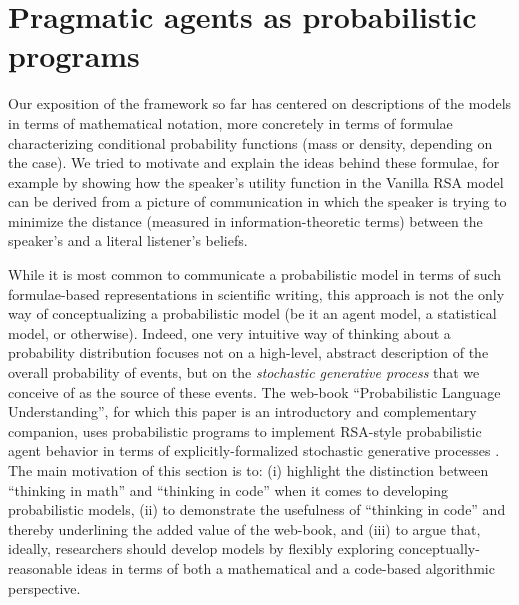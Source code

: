 \documentclass[10pt,letterpaper]{article}
\newcommand{\gcs}[1]{\textcolor{blue}{[gcs: #1]}}
\newcommand{\mht}[1]{\textcolor{purple}{[mht: #1]}}
\begin{document}
%

\section*{Pragmatic agents as probabilistic programs} \label{prob-programs}

Our exposition of the framework so far has centered on descriptions of the models in terms of mathematical notation, more concretely in terms of formulae characterizing conditional probability functions (mass or density, depending on the case).
We tried to motivate and explain the ideas behind these formulae, for example by showing how the speaker's utility function in the Vanilla RSA model can be derived from a picture of communication in which the speaker is trying to minimize the distance (measured in information-theoretic terms) between the speaker's and a literal listener's beliefs.

While it is most common to communicate a probabilistic model in terms of such formulae-based representations in scientific writing, this approach is not the only way of conceptualizing a probabilistic model (be it an agent model, a statistical model, or otherwise).
Indeed, one very intuitive way of thinking about a probability distribution focuses not on a high-level, abstract description of the overall probability of events, but on the \emph{stochastic generative process} that we conceive of as the source of these events.
The web-book ``Probabilistic Language Understanding'', for which this paper is an introductory and complementary companion, uses probabilistic programs to implement RSA-style probabilistic agent behavior in terms of explicitly-formalized stochastic generative processes \cite{problang}.
The main motivation of this section is to: (i) highlight the distinction between ``thinking in math'' and ``thinking in code'' when it comes to developing probabilistic models, (ii) to demonstrate the usefulness of ``thinking in code'' and thereby underlining the added value of the web-book, and (iii) to argue that, ideally, researchers should develop models by flexibly exploring conceptually-reasonable ideas in terms of both a mathematical and a code-based algorithmic perspective.
\end{document}
